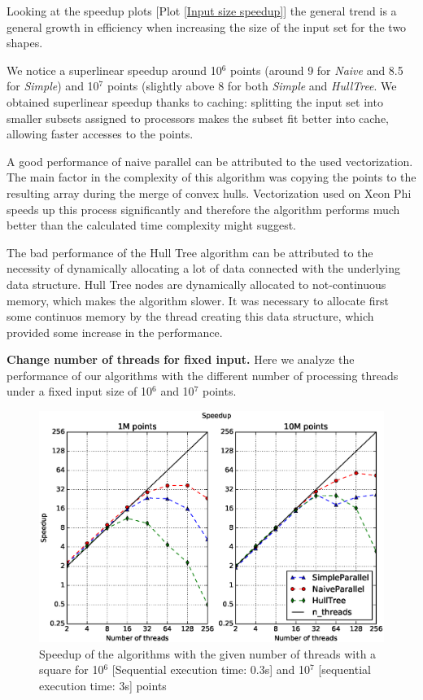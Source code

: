 \documentclass[letterpaper]{article}
\newcommand{\mypar}[1]{{\bf #1.}}
\theoremstyle{definition}
\begin{document}
Looking at the speedup plots [Plot \ref{Input size speedup}] the general trend is a general growth in efficiency when increasing the size of the input set for the two shapes.

We notice a superlinear speedup around 10$^6$ points (around 9 for \textit{Naive} and 8.5 for \textit{Simple}) and 10$^7$ points (slightly above 8 for both \textit{Simple} and \textit{HullTree}.
We obtained superlinear speedup thanks to caching: splitting the input set into smaller subsets assigned to processors makes the subset fit better into cache, allowing faster accesses to the points.

A good performance of naive parallel can be attributed to the used vectorization.
The main factor in the complexity of this algorithm was copying the points to the resulting array during the merge of convex hulls.
Vectorization used on Xeon Phi speeds up this process significantly and therefore the algorithm performs much better than the calculated time complexity might suggest.

The bad performance of the Hull Tree algorithm can be attributed to the necessity of dynamically allocating a lot of data connected with the underlying data structure.
Hull Tree nodes are dynamically allocated to not-continuous memory, which makes the algorithm slower.
It was necessary to allocate first some continuos memory by the thread creating this data structure, which provided some increase in the performance.

\mypar{Change number of threads for fixed input}
Here we analyze the performance of our algorithms with the different number of processing threads under a fixed input size of 10$^6$ and 10$^7$ points.

\begin{figure}[!ht]\centering
  \includegraphics[scale=0.33]{./plots/speedup_xeon_square_fixed_points.eps}
  \caption{Speedup of the algorithms with the given number of threads with a square for 10$^6$ [Sequential execution time: 0.3s] and 10$^7$ [sequential execution time: 3s] points\label{Threads speedup square}}
\end{figure}
\end{document}
